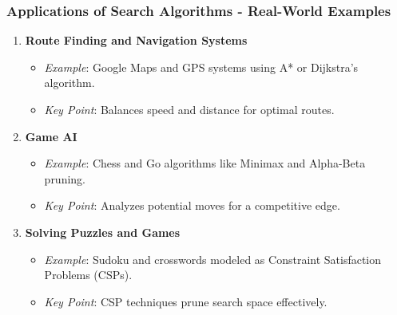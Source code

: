 \documentclass[aspectratio=169]{beamer}
\begin{document}
\begin{frame}[fragile]
    \frametitle{Applications of Search Algorithms - Real-World Examples}
    \begin{enumerate}
        \item \textbf{Route Finding and Navigation Systems}
            \begin{itemize}
                \item \textit{Example}: Google Maps and GPS systems using A* or Dijkstra's algorithm.
                \item \textit{Key Point}: Balances speed and distance for optimal routes.
            \end{itemize}
    
        \item \textbf{Game AI}
            \begin{itemize}
                \item \textit{Example}: Chess and Go algorithms like Minimax and Alpha-Beta pruning.
                \item \textit{Key Point}: Analyzes potential moves for a competitive edge.
            \end{itemize}
        
        \item \textbf{Solving Puzzles and Games}
            \begin{itemize}
                \item \textit{Example}: Sudoku and crosswords modeled as Constraint Satisfaction Problems (CSPs).
                \item \textit{Key Point}: CSP techniques prune search space effectively.
            \end{itemize}
    \end{enumerate}
\end{frame}
\end{document}
